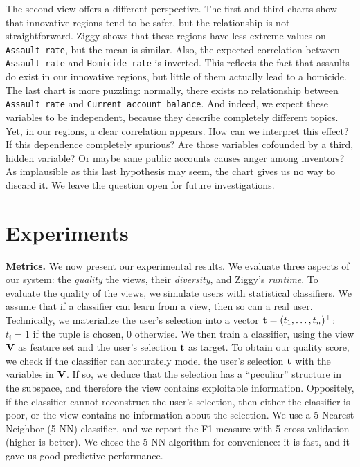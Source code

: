 The second view offers a different perspective. The first and third charts show
that innovative regions tend to be safer, but the relationship is not
straightforward. Ziggy shows that these regions have less extreme values
on \texttt{Assault rate}, but the mean is similar. Also, the expected
correlation between \texttt{Assault rate} and \texttt{Homicide rate} is
inverted. This reflects the fact that assaults do exist in our innovative
regions, but little of them actually lead to a homicide. The last chart is more
puzzling: normally, there exists no relationship between \texttt{Assault rate}
and \texttt{Current ac\-count balance}. And indeed, we expect these variables
to be independent, because they describe completely different topics. Yet,
in our regions, a clear correlation appears. How can we interpret
this effect? If this dependence completely spurious? Are those
variables cofounded by a third, hidden variable? Or maybe sane public accounts
causes anger among inventors? As implausible as this last hypothesis may seem,
the chart gives us no way to discard it. We leave the question open for future
investigations.

\section{Experiments}
\label{sec:experiments}

\textbf{Metrics.} We now present our experimental results. We evaluate
three aspects of our system: the \emph{quality} the views, their
\emph{diversity}, and Ziggy's \emph{runtime}. To evaluate the quality of the
views, we simulate users with statistical classifiers. We assume that if a
classifier can learn from a view, then so can a real user. Technically, we
materialize the user's selection into a vector $\mathbf{t} = (t_1, \ldots,
t_n)^\top$: $t_i=1$ if the tuple is chosen, 0 otherwise.  We then train a
classifier, using the view $\bf{V}$ as feature set and the user's selection
$\bf{t}$ as target. To obtain our quality score, 
we check if the classifier can accurately model the user's selection $\mathbf{t}$ with the
variables in $\bf{V}$. If so, we deduce that the selection has a
``peculiar'' structure in the subspace, and therefore the view contains
exploitable information. Oppositely, if the classifier cannot reconstruct the
user's selection, then either the classifier is poor, or the view contains no
information about the selection. We use a 5-Nearest Neighbor (5-NN) classifier,
and we report the F1 measure with 5 cross-validation (higher is better). We
chose the 5-NN algorithm for convenience: it is fast, and it gave
us good predictive performance. 


